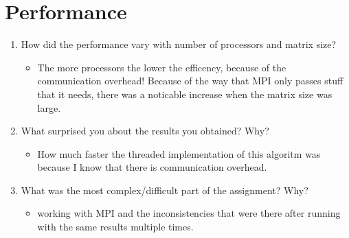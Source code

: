 \documentclass[12pt, letterpaper]{article}
\begin{document}
\section{Performance}
\begin{enumerate}
  \item How did the performance vary with number of processors and matrix size?
  \begin{itemize}
    \item The more processors the lower the efficency, because of the communication overhead! Because of the way that MPI only passes stuff that it needs, there was a noticable increase when the matrix size was large.
  \end{itemize}
  \item What surprised you about the results you obtained? Why?
  \begin{itemize}
    \item How much faster the threaded implementation of this algoritm was because I know that there is communication overhead.
  \end{itemize}
  \item What was the most complex/difficult part of the assignment? Why?
  \begin{itemize}
    \item working with MPI and the inconsistencies that were there after running with the same results multiple times.
  \end{itemize}
\end{enumerate}
\end{document}
